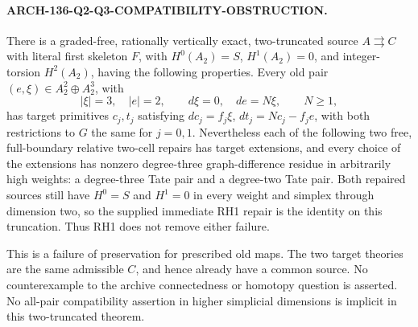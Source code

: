 \paragraph{ARCH-136-Q2-Q3-COMPATIBILITY-OBSTRUCTION.}
There is a graded-free, rationally vertically exact,
two-truncated source \(A\rightrightarrows C\) with literal
first skeleton \(F\), with \(H^0(A_2)=S\),
\(H^1(A_2)=0\), and integer-torsion \(H^2(A_2)\),
having the following properties.
Every old pair \((e,\xi)\in A_2^2\oplus A_2^3\), with
\[
 |\xi|=3,\quad |e|=2,\qquad d\xi=0,\quad de=N\xi,
                 \qquad N\geq1,
                                                        \tag{136.LTQ3}
\]
has target primitives \(c_j,t_j\) satisfying
\(dc_j=f_j\xi\), \(dt_j=Nc_j-f_je\), with both
restrictions to \(G\) the same for \(j=0,1\).
Nevertheless each of the following two free, full-boundary
relative two-cell repairs has target extensions, and every
choice of the extensions has nonzero degree-three
graph-difference residue in arbitrarily high weights:
a degree-three Tate pair and a degree-two Tate pair.
Both repaired sources still have \(H^0=S\) and
\(H^1=0\) in every weight and simplex through dimension
two, so the supplied immediate RH1 repair is the identity
on this truncation.  Thus RH1 does not remove either failure.

This is a failure of preservation for prescribed old maps.
The two target theories are the same admissible \(C\),
and hence already have a common source.  No counterexample to
the archive connectedness or homotopy question is asserted.
No all-pair compatibility assertion in higher simplicial
dimensions is implicit in this two-truncated theorem.

